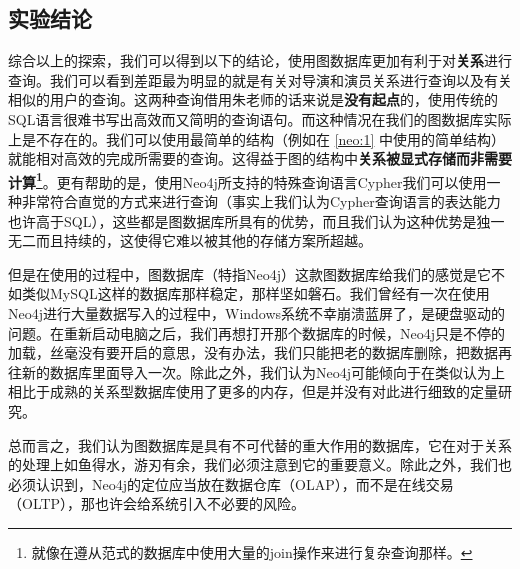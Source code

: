 \documentclass{ctexrep}
\begin{document}
	\subsection{实验结论}
	综合以上的探索，我们可以得到以下的结论，使用图数据库更加有利于对\textbf{关系}进行查询。我们可以看到差距最为明显的就是有关对导演和演员关系进行查询以及有关相似的用户的查询。这两种查询借用朱老师的话来说是\textbf{没有起点}的，使用传统的SQL语言很难书写出高效而又简明的查询语句。而这种情况在我们的图数据库实际上是不存在的。我们可以使用最简单的结构（例如在 \ref{neo:1} 中使用的简单结构）就能相对高效的完成所需要的查询。这得益于图的结构中\textbf{关系被显式存储而非需要计算\footnote{就像在遵从范式的数据库中使用大量的join操作来进行复杂查询那样。}}。更有帮助的是，使用Neo4j所支持的特殊查询语言Cypher我们可以使用一种非常符合直觉的方式来进行查询（事实上我们认为Cypher查询语言的表达能力也许高于SQL），这些都是图数据库所具有的优势，而且我们认为这种优势是独一无二而且持续的，这使得它难以被其他的存储方案所超越。
	
	但是在使用的过程中，图数据库（特指Neo4j）这款图数据库给我们的感觉是它不如类似MySQL这样的数据库那样稳定，那样坚如磐石。我们曾经有一次在使用Neo4j进行大量数据写入的过程中，Windows系统不幸崩溃蓝屏了，是硬盘驱动的问题。在重新启动电脑之后，我们再想打开那个数据库的时候，Neo4j只是不停的加载，丝毫没有要开启的意思，没有办法，我们只能把老的数据库删除，把数据再往新的数据库里面导入一次。除此之外，我们认为Neo4j可能倾向于在类似认为上相比于成熟的关系型数据库使用了更多的内存，但是并没有对此进行细致的定量研究。
	
	总而言之，我们认为图数据库是具有不可代替的重大作用的数据库，它在对于关系的处理上如鱼得水，游刃有余，我们必须注意到它的重要意义。除此之外，我们也必须认识到，Neo4j的定位应当放在数据仓库（OLAP），而不是在线交易（OLTP），那也许会给系统引入不必要的风险。
\end{document}
